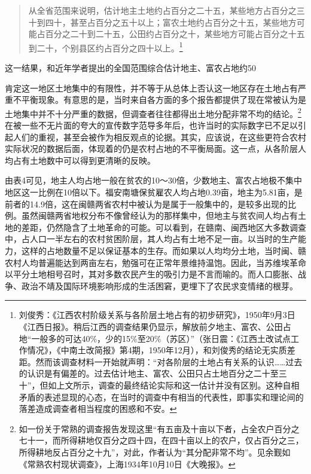 \begin{quote}

从全省范围来说明，估计地主土地约占百分之二十五，某些地方占百分之三十到四十，甚至占百分之五十以上；富农土地约占百分之十五，某些地方可能占百分之二十到二十五，公田约占百分之十，某些地方可能占百分之十五到二十，个别县区约占百分之四十以上。\footnote{刘俊秀：《江西农村阶级关系与各阶层土地占有的初步研究》，1950年9月3日《江西日报》。稍后江西的调查结果仍显示，解放前夕地主、富农、公田占地“一般多的可达40\%，少的15\%至20\%（苏区）”（张日震：《江西土改试点工作情况》，《中南土改简报》第4期，1950年12月），和刘俊秀的结论无实质差距。然而该调查材料一开始就声明：“对各阶层的土地占有关系的认识……过去的认识是有偏差的。过去估计地主、富农、公田只占土地百分之二十至三十”，但如上文所示，调查的最终结论实际和这一估计并没有区别。这种自相矛盾的表述显现的心态，在当时的调查中有相当的代表性，即事实和理论间的落差造成调查者相当程度的困惑和不安。}
\end{quote}


这一结果，和近年学者提出的全国范围综合估计地主、富农占地约50%


肯定这一地区土地集中的有限性，并不等于从总体上否认这一地区存在土地占有严重不平衡现象。有意思的是，当时来自各方面的多个报告都提供了现在常被认为是土地集中并不十分严重的数据，但调查者往往都得出土地分配非常不均的结论。\footnote{如一份关于常熟的调查报告发现这里“有五亩及十亩以下者，占全农户百分之七十一，而所得耕地仅百分之四十四，在四十亩以上的农户，仅占百分之三，所得耕地反占百分之十九”，对此，作者认为“其分配非常不均”。见余觐如《常熟农村现状调查》，上海1934年10月10日《大晚报》。}在被一些不无片面的夸大的宣传数字范导多年后，也许当时的实际数字已不足以引起人们的重视，甚至会被作为相反观点的论据。其实，应该说，在这些更符合农村实际状况的数据后面，体现着的仍是农村占地的不平衡局面。这一点，从各阶层人均占有土地数中可以得到更清晰的反映。


由表4可见，地主人均占地一般在贫农的10～30倍，少数地主、富农占地极不集中地区这一比例在10倍以下。福安南塘保贫雇农人均占地0.39亩，地主为5.81亩，是前者的14.9倍，这在闽赣两省农村中被认为是属于一般集中的，是较多出现的比例。虽然闽赣两省地权分布不像曾经认为的那样集中，但地主与贫农间人均占有土地的差距，仍然隐含了土地革命的可能。可以看到，在赣南、闽西地区大多数调查中，占人口一半左右的农村贫困阶层，其人均占有土地不足一亩。以当时的生产能力，这样的占地数量不足以保证基本的生存。而如果以人均均分土地，当时闽、赣农村人均普遍能达到两亩左右，勉强可在正常年景维持温饱。因此，当苏维埃革命以平分土地相号召时，其对多数农民产生的吸引力是不言而喻的。而人口膨胀、战争、政治不靖及国际环境影响形成的生活困窘，更埋下了农民求变情绪的根芽。

